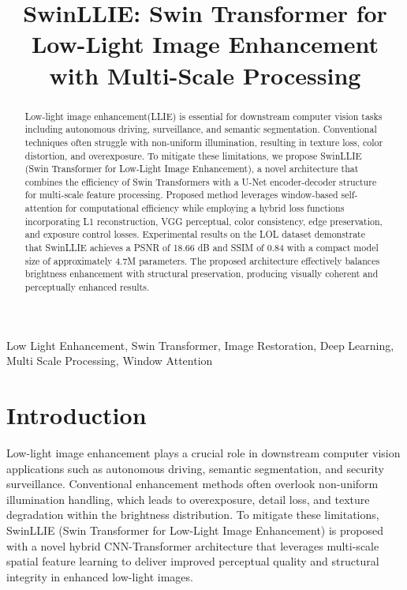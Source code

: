 \documentclass[conference]{IEEEtran}
\begin{document}
\title{SwinLLIE: Swin Transformer for Low-Light Image Enhancement with Multi-Scale Processing}

\maketitle

\begin{abstract}
Low-light image enhancement(LLIE) is essential for downstream computer vision tasks including autonomous driving, surveillance, and semantic segmentation. Conventional techniques often struggle with non-uniform illumination, resulting in texture loss, color distortion, and overexposure. To mitigate these limitations, we propose SwinLLIE (Swin Transformer for Low-Light Image Enhancement), a novel architecture that combines the efficiency of Swin Transformers with a U-Net encoder-decoder structure for multi-scale feature processing. Proposed method leverages window-based self-attention for computational efficiency while employing a hybrid loss functions incorporating L1 reconstruction, VGG perceptual, color consistency, edge preservation, and exposure control losses. Experimental results on the LOL dataset demonstrate that SwinLLIE achieves a PSNR of 18.66 dB and SSIM of 0.84 with a compact model size of approximately 4.7M parameters. The proposed architecture effectively balances brightness enhancement with structural preservation, producing visually coherent and perceptually enhanced results.
\end{abstract}

\begin{IEEEkeywords}
Low Light Enhancement, Swin Transformer, Image Restoration, Deep Learning, Multi Scale Processing, Window Attention
\end{IEEEkeywords}

\section{Introduction}

Low-light image enhancement plays a crucial role in downstream computer vision applications such as autonomous driving, semantic segmentation, and security surveillance. Conventional enhancement methods often overlook non-uniform illumination handling, which leads to overexposure, detail loss, and texture degradation within the brightness distribution. To mitigate these limitations, SwinLLIE (Swin Transformer for Low-Light Image Enhancement) is proposed with a novel hybrid CNN-Transformer architecture that leverages multi-scale spatial feature learning to deliver improved perceptual quality and structural integrity in enhanced low-light images.
\end{document}
